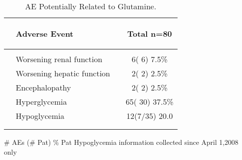 \documentclass[dvips,10pt]{article}
\begin{document}
\begin{table}[t]
\caption
{ AE Potentially Related to Glutamine. }
\begin{center}
\begin{tabular}{ @{}l@{}
@{}l@{}@{}p{1.5em}@{}@{}c@{}
}
\hline

& \parbox{6em}{\begin{center}Adverse Event\end{center}} && \parbox{6em}{\begin{center}Total n=80\end{center}} \\

\hline

\\
& Worsening renal function && 6(  6)  7.5\% \\
& Worsening hepatic function && 2(  2)  2.5\% \\
& Encephalopathy && 2(  2)  2.5\% \\
& Hyperglycemia && 65( 30) 37.5\% \\
& Hypoglycemia && 12(7/35) 20.0 \\
\\
\hline \\

\end{tabular}


\parbox{ 5in }{ \# AEs (\# Pat) \% Pat \newline Hypoglycemia information collected since April 1,2008 only } \\
 \vspace{1em}\end{center}
 \end{table}
\clearpage
\end{document}
